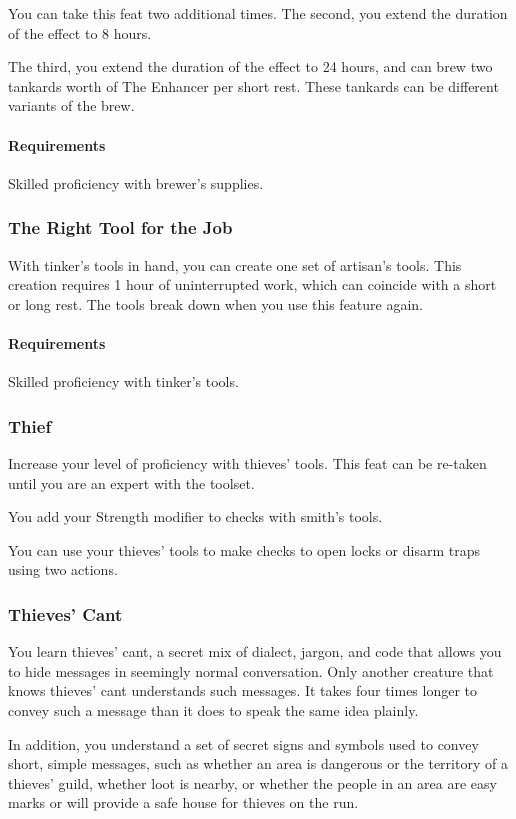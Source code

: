     You can take this feat two additional times.
    The second, you extend the duration of the effect to 8 hours.

    The third, you extend the duration of the effect to 24 hours, and can brew two tankards worth of The Enhancer per short rest.
    These tankards can be different variants of the brew.
    \paragraph{Requirements} Skilled proficiency with brewer's supplies.
\subsubsection{The Right Tool for the Job} \label{feat::therighttoolforthejob}
    With tinker's tools in hand, you can create one set of artisan's tools.
    This creation requires 1 hour of uninterrupted work, which can coincide with a short or long rest.
    The tools break down when you use this feature again.
    \paragraph{Requirements} Skilled proficiency with tinker's tools.
\subsubsection{Thief} \label{feat::thief}
    Increase your level of proficiency with thieves' tools.
    This feat can be re-taken until you are an expert with the toolset.

    You add your Strength modifier to checks with smith's tools.

    You can use your thieves' tools to make checks to open locks or disarm traps using two actions.
\subsubsection{Thieves' Cant} \label{feat::thievescant}
    You learn thieves' cant, a secret mix of dialect, jargon, and code that allows you to hide messages in seemingly normal conversation.
    Only another creature that knows thieves' cant understands such messages.
    It takes four times longer to convey such a message than it does to speak the same idea plainly.

    In addition, you understand a set of secret signs and symbols used to convey short, simple messages, such as whether an area is dangerous or the territory of a thieves' guild, whether loot is nearby, or whether the people in an area are easy marks or will provide a safe house for thieves on the run.
